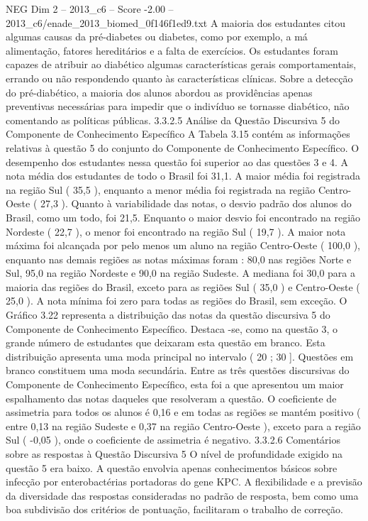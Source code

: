 \begin{textsample}{NEG Dim 2 – 2013\_c6 – Score -2.00 – 2013\_c6/enade\_2013\_biomed\_0f146f1ed9.txt}
A maioria dos estudantes citou algumas causas da pré-diabetes ou diabetes, como por exemplo, a má alimentação, fatores hereditários e a falta de exercícios.
Os estudantes foram capazes de atribuir ao diabético algumas características gerais comportamentais, errando ou não respondendo quanto às características clínicas.
Sobre a detecção do pré-diabético, a maioria dos alunos abordou as providências apenas preventivas necessárias para impedir que o indivíduo se tornasse diabético, não comentando as políticas públicas. 3.3.2.5 Análise da Questão Discursiva 5 do Componente de Conhecimento Específico A Tabela 3.15 contém as informações relativas à questão 5 do conjunto do Componente de Conhecimento Específico.
O desempenho dos estudantes nessa questão foi superior ao das questões 3 e 4.
A nota média dos estudantes de todo o Brasil foi 31,1.
A maior média foi registrada na região Sul ( 35,5 ), enquanto a menor média foi registrada na região Centro-Oeste ( 27,3 ).
Quanto à variabilidade das notas, o desvio padrão dos alunos do Brasil, como um todo, foi 21,5.
Enquanto o maior desvio foi encontrado na região Nordeste ( 22,7 ), o menor foi encontrado na região Sul ( 19,7 ).
A maior nota máxima foi alcançada por pelo menos um aluno na região Centro-Oeste ( 100,0 ), enquanto nas demais regiões as notas máximas foram : 80,0 nas regiões Norte e Sul, 95,0 na região Nordeste e 90,0 na região Sudeste.
A mediana foi 30,0 para a maioria das regiões do Brasil, exceto para as regiões Sul ( 35,0 ) e Centro-Oeste ( 25,0 ).
A nota mínima foi zero para todas as regiões do Brasil, sem exceção.
O Gráfico 3.22 representa a distribuição das notas da questão discursiva 5 do Componente de Conhecimento Específico.
Destaca -se, como na questão 3, o grande número de estudantes que deixaram esta questão em branco.
Esta distribuição apresenta uma moda principal no intervalo ( 20 ; 30 ].
Questões em branco constituem uma moda secundária.
Entre as três questões discursivas do Componente de Conhecimento Específico, esta foi a que apresentou um maior espalhamento das notas daqueles que resolveram a questão.
O coeficiente de assimetria para todos os alunos é 0,16 e em todas as regiões se mantém positivo ( entre 0,13 na região Sudeste e 0,37 na região Centro-Oeste ), exceto para a região Sul ( -0,05 ), onde o coeficiente de assimetria é negativo. 3.3.2.6 Comentários sobre as respostas à Questão Discursiva 5 O nível de profundidade exigido na questão 5 era baixo.
A questão envolvia apenas conhecimentos básicos sobre infecção por enterobactérias portadoras do gene KPC.
A flexibilidade e a previsão da diversidade das respostas consideradas no padrão de resposta, bem como uma boa subdivisão dos critérios de pontuação, facilitaram o trabalho de correção.

\end{textsample}
